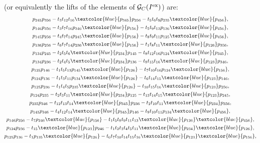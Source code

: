\documentclass[10pt,a4paper]{amsart}
\numberwithin{equation}{section}
\begin{document}
 (or equivalently the lifts of the elements of $\mathcal G_{C}(I^{\rm ex})$) are:
\begin{gather*}
p_{245}p_{356} - t_{3}t_{12}t_{16}\textcolor{blue}{p_{345}}p_{256}-t_{5}t_{6}t_{9}p_{235}\textcolor{blue}{p_{456}},
\\[.2ex]
p_{146}p_{356}-t_{3}t_{7}t_{16}p_{346}\textcolor{blue}{p_{156}}-t_{5}t_{9}t_{13}p_{136} \textcolor{blue}{p_{456}},
\\[.2ex]
p_{145}p_{256}-t_{4}t_{7}t_{14}p_{245}\textcolor{blue}{p_{156}}-t_{8}t_{9}t_{11}p_{125}\textcolor{blue}{p_{456}},\\[.2ex]
p_{136}p_{256}-t_{6}t_{7}t_{14}p_{236}\textcolor{blue}{p_{156}}-t_{1}t_{8}t_{11}\textcolor{blue}{p_{126}}p_{356},\\[.2ex]
p_{134}p_{245}-t_{2}t_{5}t_{6}\textcolor{blue}{p_{234}}p_{145}-t_{8}t_{12}t_{16}p_{124}\textcolor{blue}{p_{345}},\\[.2ex]
p_{134}p_{236}-t_{2}t_{4}t_{5}\textcolor{blue}{p_{234}}p_{136}-t_{8}t_{15}t_{16}\textcolor{blue}{p_{123}}p_{346},\\[.2ex]
p_{125}p_{146}-t_{1}t_{5}t_{13}p_{145}\textcolor{blue}{p_{126}}-t_{7}t_{10}t_{16}p_{124}\textcolor{blue}{p_{156}},\\[.2ex]
p_{124}p_{136}-t_{1}t_{3}t_{11}p_{134}\textcolor{blue}{p_{126}}-t_{6}t_{14}t_{15}\textcolor{blue}{p_{123}}p_{146},\\[.2ex]
p_{125}p_{236}-t_{1}t_{4}t_{5}p_{235}\textcolor{blue}{p_{126}}-t_{10}t_{15}t_{16}\textcolor{blue}{p_{123}}p_{256},\\[.2ex]
p_{124}p_{235}-t_{2}t_{3}t_{11}\textcolor{blue}{p_{234}}p_{125}-t_{13}t_{14}t_{15}\textcolor{blue}{p_{123}}p_{245},\\[.2ex]
p_{235}p_{346}-t_{12}t_{13}t_{14}\textcolor{blue}{p_{345}}p_{236}-t_{2}t_{10}t_{11}\textcolor{blue}{p_{234}}p_{356},\\[.2ex]
p_{145}p_{346}-t_{4}t_{12}t_{14}\textcolor{blue}{p_{345}}p_{146}-t_{9}t_{10}t_{11}p_{134}\textcolor{blue}{p_{456}},\\[.2ex]
p_{146}p_{256}-t_{7}p_{246}\textcolor{blue}{p_{156}}-t_{1}t_{5}t_{8}t_{9}t_{11}t_{13}\textcolor{blue}{p_{126}}\textcolor{blue}{p_{456}},\\[.2ex]
p_{124}p_{236}-t_{15}\textcolor{blue}{p_{123}}p_{246}-t_{1}t_{2}t_{3}t_{4}t_{5}t_{11}\textcolor{blue}{p_{234}}\textcolor{blue}{p_{126}},\\[.2ex]
p_{125}p_{136}-t_{1}p_{135}\textcolor{blue}{p_{126}}-t_{6}t_{7}t_{10}t_{14}t_{15}t_{16}\textcolor{blue}{p_{123}}\textcolor{blue}{p_{156}},

\end{gather*}
\end{document}
